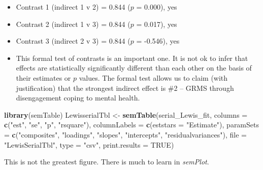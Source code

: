 \documentclass[
  11pt,
]{book}
\newenvironment{Shaded}{\begin{snugshade}}{\end{snugshade}}
\newcommand{\AttributeTok}[1]{\textcolor[rgb]{0.27,0.27,0.27}{#1}}
\newcommand{\ConstantTok}[1]{\textcolor[rgb]{0.37,0.37,0.37}{#1}}
\newcommand{\FunctionTok}[1]{\textcolor[rgb]{0.27,0.27,0.27}{\textbf{#1}}}
\newcommand{\NormalTok}[1]{#1}
\newcommand{\OtherTok}[1]{\textcolor[rgb]{0.37,0.37,0.37}{#1}}
\newcommand{\StringTok}[1]{\textcolor[rgb]{0.5,0.5,0.5}{#1}}
\providecommand{\tightlist}{%
  \setlength{\itemsep}{0pt}\setlength{\parskip}{0pt}}
\begin{document}
\begin{itemize}
  \begin{itemize}
  \tightlist
  \item
    Contrast 1 (indirect 1 v 2) = 0.844 (\(p\) = 0.000), yes
  \item
    Contrast 2 (indirect 1 v 3) = 0.844 (\(p\) = 0.017), yes
  \item
    Contrast 3 (indirect 2 v 3) = 0.844 (\(p\) = -0.546), yes
  \item
    This formal test of contrasts is an important one. It is not ok to infer that effects are statistically significantly different than each other on the basis of their estimates or \(p\) values. The formal test allows us to claim (with justification) that the strongest indirect effect is \#2 -- GRMS through disengagement coping to mental health.
  \end{itemize}
\end{itemize}

\begin{Shaded}
\begin{Highlighting}[]
\FunctionTok{library}\NormalTok{(semTable)}
\NormalTok{LewisserialTbl }\OtherTok{\textless{}{-}} \FunctionTok{semTable}\NormalTok{(serial\_Lewis\_fit, }\AttributeTok{columns =} \FunctionTok{c}\NormalTok{(}\StringTok{"est"}\NormalTok{, }\StringTok{"se"}\NormalTok{, }\StringTok{"p"}\NormalTok{,}
    \StringTok{"rsquare"}\NormalTok{), }\AttributeTok{columnLabels =} \FunctionTok{c}\NormalTok{(}\AttributeTok{eststars =} \StringTok{"Estimate"}\NormalTok{), }\AttributeTok{paramSets =} \FunctionTok{c}\NormalTok{(}\StringTok{"composites"}\NormalTok{,}
    \StringTok{"loadings"}\NormalTok{, }\StringTok{"slopes"}\NormalTok{, }\StringTok{"intercepts"}\NormalTok{, }\StringTok{"residualvariances"}\NormalTok{), }\AttributeTok{file =} \StringTok{"LewisSerialTbl"}\NormalTok{,}
    \AttributeTok{type =} \StringTok{"csv"}\NormalTok{, }\AttributeTok{print.results =} \ConstantTok{TRUE}\NormalTok{)}
\end{Highlighting}
\end{Shaded}

This is not the greatest figure. There is much to learn in \emph{semPlot}.
\end{document}
